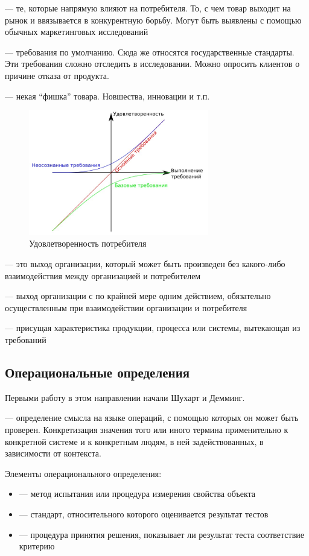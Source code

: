 \documentclass[a4paper, 14pt]{extarticle}
\begin{document}
 --- те, которые напрямую влияют на потребителя. То, с чем товар выходит на рынок и ввязывается в конкурентную борьбу. Могут быть выявлены с помощью обычных маркетинговых исследований

 --- требования по умолчанию. Сюда же относятся государственные стандарты. Эти требования сложно отследить в исследовании. Можно опросить клиентов о причине отказа от продукта.

 --- некая ``фишка'' товара. Новшества, инновации и т.п.

\begin{figure}[h]
    \centering
    \includegraphics[width=0.7\textwidth]{./img/L2/S002.jpg}
    \caption{Удовлетворенность потребителя}%
    \label{img:l2:2}
\end{figure}

 --- это выход организации, который может быть произведен без какого-либо взаимодействия между организацией и потребителем

 --- выход организации с по крайней мере одним действием, обязательно осуществленным при взаимодействии организации и потребителя

 --- присущая характеристика продукции, процесса или системы, вытекающая из требований

\subsection{Операциональные определения}
Первыми работу в этом направлении начали Шухарт и Демминг.

 --- определение смысла на языке операций, с помощью которых он может быть проверен. Конкретизация значения того или иного термина применительно к конкретной системе и к конкретным людям, в ней задействованных, в зависимости от контекста. 

Элементы операционального определения:
\begin{itemize}
    \item {} --- метод испытания или процедура измерения свойства объекта
    \item {} --- стандарт, относительного которого оценивается результат тестов
    \item {} --- процедура принятия решения, показывает ли результат теста соответствие критерию
\end{itemize}
\end{document}
